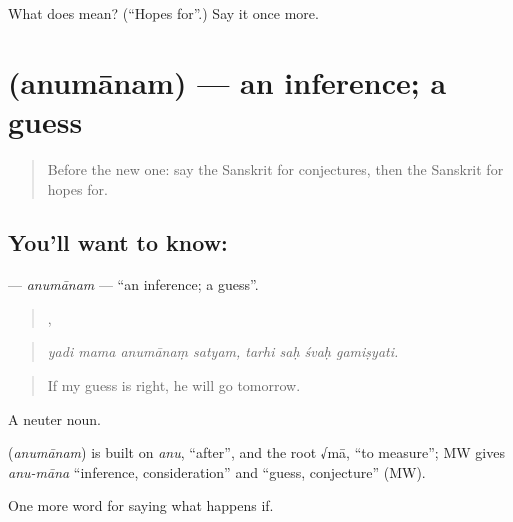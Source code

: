 \begin{tcolorbox}[breakable,colback=teal!4,colframe=teal!35!black,title={Before you move on}]
What does  mean? (\textquotedblleft{}Hopes for\textquotedblright{}.) Say it once more.
\end{tcolorbox}
\section[\texorpdfstring{\sk{अनुमानम्} (anumānam)}{अनुमानम् (anumānam)}]{ (anumānam) — an inference; a guess}

\label{lesson:SA-C368-anumanam}



\begin{quote}
Before the new one: say the Sanskrit for conjectures, then the Sanskrit for hopes for.
\end{quote}

\subsection*{You'll want to know: }
\textbf{} — \emph{anumānam} — \textquotedblleft{}an inference; a guess\textquotedblright{}.

\begin{quote}
   ,    
\end{quote}

\begin{quote}
\emph{yadi mama anumānaṃ satyam, tarhi saḥ śvaḥ gamiṣyati.}
\end{quote}

\begin{quote}
If my guess is right, he will go tomorrow.
\end{quote}

A neuter noun.

\begin{cousinweb}
\textbf{} (\emph{anumānam}) is built on \emph{anu}, \textquotedblleft{}after\textquotedblright{}, and the root √mā, \textquotedblleft{}to measure\textquotedblright{}; MW gives \emph{anu-māna} \textquotedblleft{}inference, consideration\textquotedblright{} and \textquotedblleft{}guess, conjecture\textquotedblright{} (MW).
\end{cousinweb}

\begin{grammarlens}[title={What you've built}]
One more word for saying what happens if.
\end{grammarlens}

